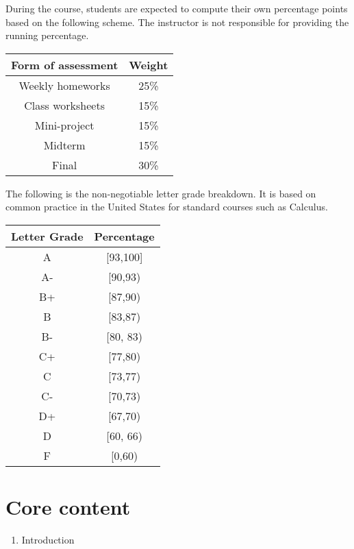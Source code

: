 \documentclass[
]{book}
\providecommand{\tightlist}{%
  \setlength{\itemsep}{0pt}\setlength{\parskip}{0pt}}
\theoremstyle{definition}
\theoremstyle{definition}
\theoremstyle{definition}
\theoremstyle{definition}
\theoremstyle{remark}
\begin{document}
During the course, students are expected to compute their own percentage
points based on the following scheme.
The instructor is not responsible for providing the running percentage.

\begin{longtable}[]{@{}cc@{}}
\toprule\noalign{}
\textbf{Form of assessment} & \textbf{Weight} \\
\midrule\noalign{}
\endhead
\bottomrule\noalign{}
\endlastfoot
Weekly homeworks & 25\% \\
Class worksheets & 15\% \\
Mini-project & 15\% \\
Midterm & 15\% \\
Final & 30\% \\
\end{longtable}

The following is the non-negotiable letter grade breakdown. It is based on
common practice in the United States for standard courses such as Calculus.

\begin{longtable}[]{@{}cc@{}}
\toprule\noalign{}
\textbf{Letter Grade} & \textbf{Percentage} \\
\midrule\noalign{}
\endhead
\bottomrule\noalign{}
\endlastfoot
A & {[}93,100{]} \\
A- & {[}90,93) \\
B+ & {[}87,90) \\
B & {[}83,87) \\
B- & {[}80, 83) \\
C+ & {[}77,80) \\
C & {[}73,77) \\
C- & {[}70,73) \\
D+ & {[}67,70) \\
D & {[}60, 66) \\
F & {[}0,60) \\
\end{longtable}

\hypertarget{core-content}{%
\section*{Core content}\label{core-content}}

\begin{enumerate}
\def\labelenumi{\arabic{enumi}.}
\tightlist
\item
  Introduction
\end{enumerate}
\end{document}
